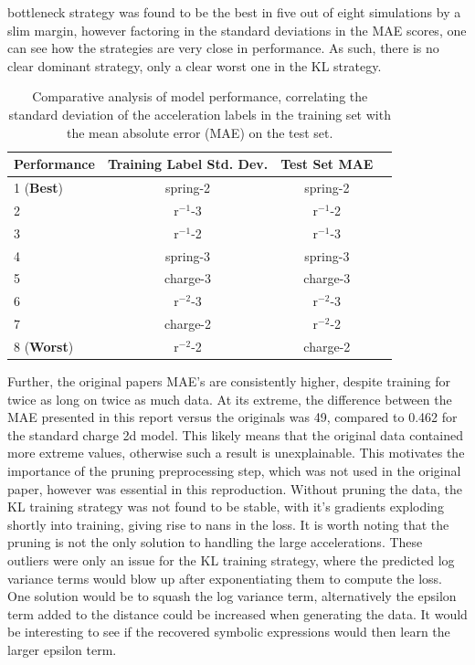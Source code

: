 \documentclass[11pt]{article}
\begin{document}
bottleneck strategy was found to be the best in five out of eight simulations by a slim margin, however factoring in the standard deviations in the MAE scores, one can see how the strategies are very close in performance. As such, there is no clear dominant strategy, only a clear worst one in the KL strategy.
\begin{table}[H]
    \centering
    \begin{tabular}{lccc}
    \toprule
    Performance & Training Label Std. Dev. & Test Set MAE\\
    \midrule
    1 (\textbf{Best}) & spring-2 & spring-2 \\
    2& r$^{-1}$-3 & r$^{-1}$-2  \\
    3& r$^{-1}$-2 & r$^{-1}$-3 \\
    4& spring-3 & spring-3\\
    5& charge-3 & charge-3\\
    6& r$^{-2}$-3 & r$^{-2}$-3\\
    7& charge-2 & r$^{-2}$-2\\
    8 (\textbf{Worst})& r$^{-2}$-2 & charge-2\\
    \bottomrule
    \end{tabular}
    \caption{Comparative analysis of model performance, correlating the standard deviation of the acceleration labels in the training set with the mean absolute error (MAE) on the test set.}
    \label{tab:std_table_2}
\end{table}
Further, the original papers MAE's are consistently higher, despite training for twice as long on twice as much data. At its extreme, the difference between the MAE presented in this report versus the originals was 49, compared to 0.462 for the standard charge 2d model. This likely means that the original data contained more extreme values, otherwise such a result is unexplainable. This motivates the importance of the pruning preprocessing step, which was not used in the original paper, however was essential in this reproduction. Without pruning the data, the KL training strategy was not found to be stable, with it's gradients exploding shortly into training, giving rise to nans in the loss. It is worth noting that the pruning is not the only solution to handling the large accelerations. These outliers were only an issue for the KL training strategy, where the predicted log variance terms would blow up after exponentiating them to compute the loss. One solution would be to squash the log variance term, alternatively the epsilon term added to the distance could be increased when generating the data. It would be interesting to see if the recovered symbolic expressions would then learn the larger epsilon term.
\end{document}
